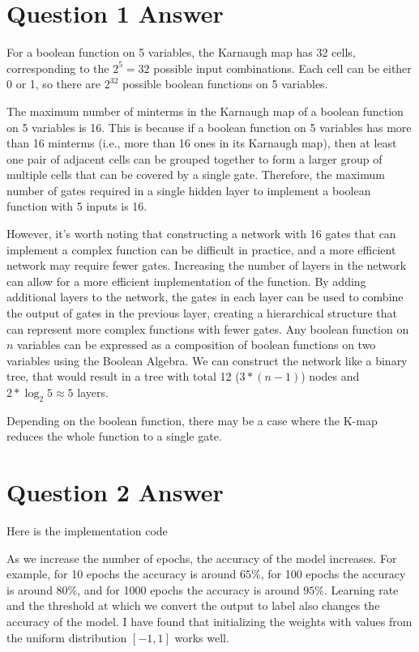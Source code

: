 \documentclass{article}
\begin{document}
\thispagestyle{firstpage}

\section*{Question 1 Answer}

For a boolean function on 5 variables, the Karnaugh map has 32 cells, corresponding to the $2^{5} = 32$ possible input combinations. Each cell can be either 0 or 1, so there are $2^{32}$ possible boolean functions on 5 variables.

The maximum number of minterms in the Karnaugh map of a boolean function on 5 variables is 16. This is because if a boolean function on 5 variables has more than 16 minterms (i.e., more than 16 ones in its Karnaugh map), then at least one pair of adjacent cells can be grouped together to form a larger group of multiple cells that can be covered by a single gate. Therefore, the maximum number of gates required in a single hidden layer to implement a boolean function with 5 inputs is 16.

However, it's worth noting that constructing a network with 16 gates that can implement a complex function can be difficult in practice, and a more efficient network may require fewer gates. Increasing the number of layers in the network can allow for a more efficient implementation of the function. By adding additional layers to the network, the gates in each layer can be used to combine the output of gates in the previous layer, creating a hierarchical structure that can represent more complex functions with fewer gates. Any boolean function on $n$ variables can be expressed as a composition of boolean functions on two variables using the Boolean Algebra. We can construct the network like a binary tree, that would result in a tree with total 12 ($3*(n-1)$) nodes and $2 * \log_{2} 5 \approx 5$ layers.

Depending on the boolean function, there may be a case where the K-map reduces the whole function to a single gate.

\section*{Question 2 Answer}
Here is the implementation code


As we increase the number of epochs, the accuracy of the model increases. For example, for 10 epochs the accuracy is around $65\%$, for 100 epochs the accuracy is around $80\%$, and for 1000 epochs the accuracy is around $95\%$. Learning rate and the threshold at which we convert the output to label also changes the accuracy of the model. I have found that initializing the weights with values from the uniform distribution $[-1,1]$ works well.
\end{document}
